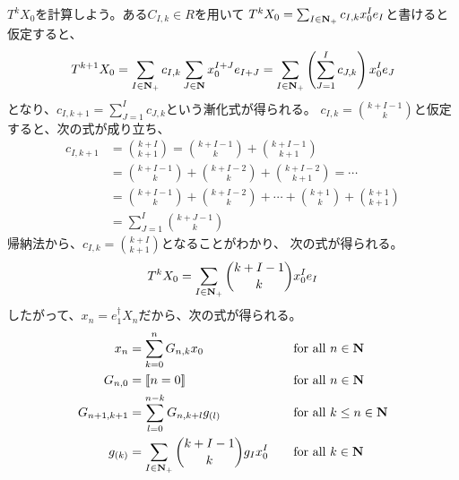 {	$T^kX_0$を計算しよう。ある$C_{I,k}\in R$を用いて
	$T^kX_0=\sum_{I\in\mathbf{N}_+}c_{I,k}x_0^Ie_I$と書けると仮定すると、
	\begin{equation*}\begin{split}
		T^{k+1}X_0 = \sum_{I\in\mathbf{N}_+}c_{I,k}\sum_{J\in\mathbf{N}}x_0^{I+J}e_{I+J}
		= \sum_{I\in\mathbf{N}_+}\mathinner{\left({\sum_{J=1}^Ic_{J,k}}\right)}x_0^Ie_J
	\end{split}\end{equation*}
	となり、$c_{I,k+1}=\sum_{J=1}^Ic_{J,k}$という漸化式が得られる。
	$c_{I,k}=\binom{k+I-1}{k}$と仮定すると、次の式が成り立ち、
	\begin{equation*}\begin{split}
		c_{I,k+1} &= \binom{k+I}{k+1} = \binom{k+I-1}{k} + \binom{k+I-1}{k+1} \\
		&= \binom{k+I-1}{k} + \binom{k+I-2}{k} + \binom{k+I-2}{k+1}
		= \cdots \\
		&= \binom{k+I-1}{k} + \binom{k+I-2}{k} +\cdots+ \binom{k+1}{k} 
			+ \binom{k+1}{k+1} \\
		&= \sum_{J=1}^I \binom{k+J-1}{k}
	\end{split}\end{equation*}
	帰納法から、$c_{I,k}=\binom{k+I}{k+1}$となることがわかり、
	次の式が得られる。
	\begin{equation*}\begin{split}
		T^kX_0 = \sum_{I\in\mathbf{N}_+} \binom{k+I-1}{k}x_0^Ie_I
	\end{split}\end{equation*}
	したがって、$x_n=e_1^\dag X_n$だから、次の式が得られる。
	\begin{alignat*}{2}
		x_n &= \sum_{k=0}^n G_{n,k}x_0 &&\quad\text{for all } n\in\mathbf{N} \\
		G_{n,0} &= \mathinner{[\![n=0]\!]} &&\quad\text{for all } n\in\mathbf{N} \\
		G_{n+1,k+1} &= \sum_{l=0}^{n-k}G_{n,k+l}g_{(l)} 
			&&\quad\text{for all } k\le n\in\mathbf{N} \\
		g_{(k)} &= \sum_{I\in\mathbf{N}_+}\binom{k+I-1}{k}g_Ix_0^I 
			&&\quad\text{for all } k\in\mathbf{N}
	\end{alignat*}

}
